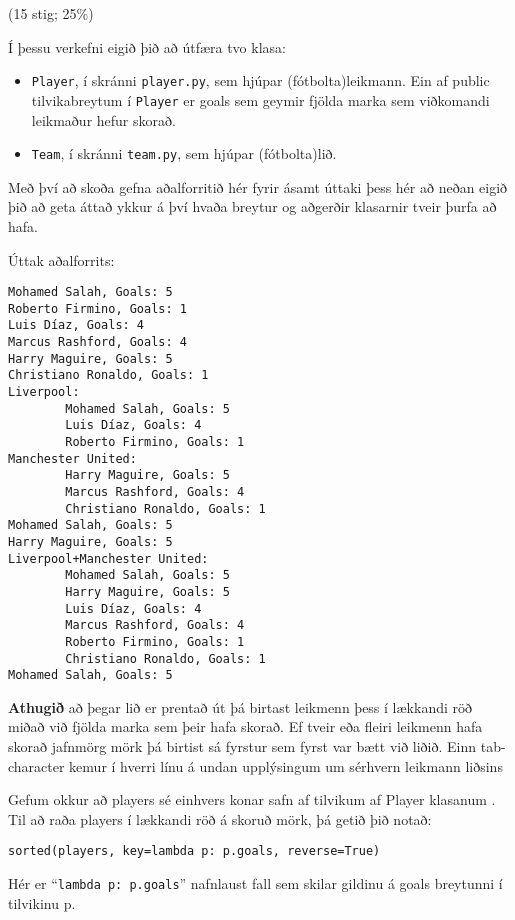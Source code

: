 (15 stig; 25\%)

Í þessu verkefni eigið þið að útfæra tvo klasa:
\begin{itemize}
    \item \texttt{Player}, í skránni \texttt{player.py}, sem hjúpar (fótbolta)leikmann. Ein af public tilvikabreytum í \texttt{Player} er goals sem geymir fjölda marka sem viðkomandi leikmaður hefur skorað.
    \item \texttt{Team}, í skránni \texttt{team.py}, sem hjúpar (fótbolta)lið.
\end{itemize}
Með því að skoða gefna aðalforritið hér fyrir ásamt úttaki þess hér að neðan eigið þið að geta áttað ykkur á því hvaða breytur og aðgerðir klasarnir tveir þurfa að hafa.


Úttak aðalforrits:
\begin{verbatim}
Mohamed Salah, Goals: 5
Roberto Firmino, Goals: 1
Luis Díaz, Goals: 4
Marcus Rashford, Goals: 4
Harry Maguire, Goals: 5
Christiano Ronaldo, Goals: 1
Liverpool:
        Mohamed Salah, Goals: 5
        Luis Díaz, Goals: 4
        Roberto Firmino, Goals: 1
Manchester United:
        Harry Maguire, Goals: 5
        Marcus Rashford, Goals: 4
        Christiano Ronaldo, Goals: 1
Mohamed Salah, Goals: 5
Harry Maguire, Goals: 5
Liverpool+Manchester United:
        Mohamed Salah, Goals: 5
        Harry Maguire, Goals: 5
        Luis Díaz, Goals: 4
        Marcus Rashford, Goals: 4
        Roberto Firmino, Goals: 1
        Christiano Ronaldo, Goals: 1
Mohamed Salah, Goals: 5
\end{verbatim}


\textbf{Athugið} að þegar lið er prentað út þá birtast leikmenn þess í lækkandi röð miðað við fjölda marka sem þeir hafa skorað.
Ef tveir eða fleiri leikmenn hafa skorað jafnmörg mörk þá birtist sá fyrstur sem fyrst var bætt við liðið. 
Einn tab-character kemur í hverri línu á undan upplýsingum um sérhvern leikmann liðsins

Gefum okkur að players sé einhvers konar safn af tilvikum af Player klasanum . Til að raða players í lækkandi röð á skoruð mörk, þá getið þið notað:

\texttt{sorted(players, key=lambda p: p.goals, reverse=True)}

Hér er ``\texttt{lambda p: p.goals}'' nafnlaust fall sem skilar gildinu á goals breytunni í tilvikinu p.
